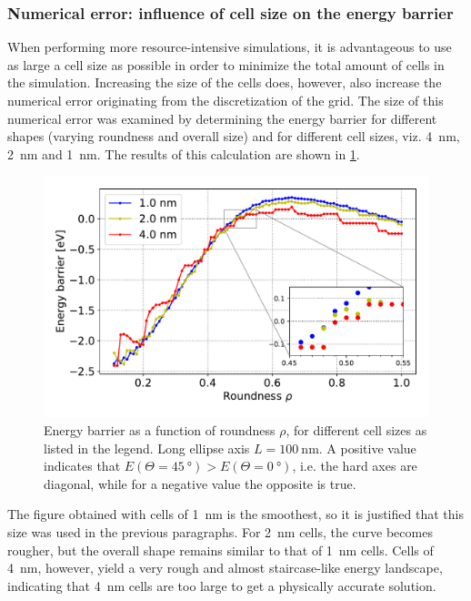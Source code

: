 \documentclass[11pt,a4paper,english,twoside]{article}
\begin{document}
\subsubsection{Numerical error: influence of cell size on the energy barrier}
When performing more resource-intensive simulations, it is advantageous to use as large a cell size as possible in order to minimize the total amount of cells in the simulation. Increasing the size of the cells does, however, also increase the numerical error originating from the discretization of the grid. The size of this numerical error was examined by determining the energy barrier for different shapes (varying roundness and overall size) and for different cell sizes, viz. \SI{4}{\nano\metre}, \SI{2}{\nano\metre} and \SI{1}{\nano\metre}. The results of this calculation are shown in \cref{fig:barrier-cell_size-100nm}. \par
\begin{figure}
    \centering
    \includegraphics[width=0.9\columnwidth]{Figures/biaxial_island/Barrier/Plus_100_0.1-1_aPi128_B0.01_cell1,2,4nm.pdf}
    \caption{Energy barrier as a function of roundness $\rho$, for different cell sizes as listed in the legend. Long ellipse axis $L=\SI{100}{\nano\metre}$. A positive value indicates that $E(\Theta=\SI{45}{\degree}) > E(\Theta=\SI{0}{\degree})$, i.e. the hard axes are diagonal, while for a negative value the opposite is true.}
    \label{fig:barrier-cell_size-100nm}
\end{figure}
The figure obtained with cells of \SI{1}{\nano\metre} is the smoothest, so it is justified that this size was used in the previous paragraphs. For \SI{2}{\nano\metre} cells, the curve becomes rougher, but the overall shape remains similar to that of \SI{1}{\nano\metre} cells. Cells of \SI{4}{\nano\metre}, however, yield a very rough and almost staircase-like energy landscape, indicating that \SI{4}{\nano\metre} cells are too large to get a physically accurate solution. \par
\end{document}
